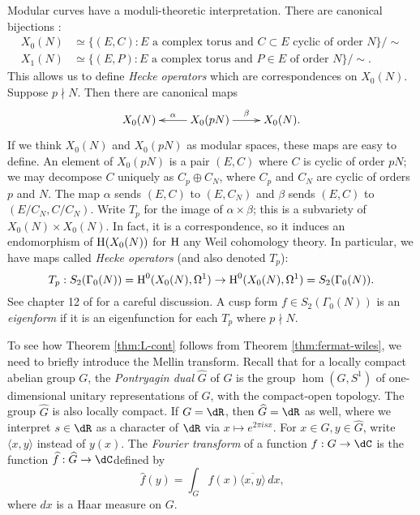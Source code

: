Modular curves have a moduli-theoretic interpretation. There are canonical 
bijections \cite[1.5]{ds05}:
\begin{align*}
  X_0(N) &\simeq \{(E,C):\text{$E$ a complex torus and $C\subset E$ cyclic of order $N$}\}/\sim  \\
  X_1(N) &\simeq \{(E,P):\text{$E$ a complex torus and $P\in E$ of order $N$}\}/\sim \text{.}
\end{align*}
This allows us to define \emph{Hecke operators} which are correspondences on 
$X_0(N)$. Suppose $p\nmid N$. Then there are canonical maps 
\[\xymatrix{
  X_0(N) 
    & \ar[l]_-\alpha X_0(p N) \ar[r]^-\beta 
    & X_0(N) \text{.}
}\]
If we think $X_0(N)$ and $X_0(p N)$ as modular spaces, these maps are easy to 
define. An element of $X_0(p N)$ is a pair $(E,C)$ where $C$ is cyclic of order 
$p N$; we may decompose $C$ uniquely as $C_p\oplus C_N$, where $C_p$ and $C_N$ 
are cyclic of orders $p$ and $N$. The map $\alpha$ sends $(E,C)$ to 
$(E,C_N)$ and $\beta$ sends $(E,C)$ to $(E/C_N,C/C_N)$. Write 
$T_p$ for the image of $\alpha\times \beta$; this is a subvariety of 
$X_0(N)\times X_0(N)$. In fact, it is a correspondence, so it induces an 
endomorphism of $\operatorname{H}(X_0(N))$ for $\operatorname{H}$ any Weil cohomology theory. In 
particular, we have maps called \emph{Hecke operators} (and also denoted 
$T_p$):
\[
  T_p:S_2(\Gamma_0(N)) = \operatorname{H}^0(X_0(N),\Omega^1) \to \operatorname{H}^0(X_0(N),\Omega^1) = S_2(\Gamma_0(N)) \text{.}
\]
See chapter 12 of \cite{rs11} for a careful discussion. A cusp form 
$f\in S_2(\Gamma_0(N))$ is an \emph{eigenform} if it is an eigenfunction for 
each $T_p$ where $p\nmid N$. 

To see how Theorem \ref{thm:L-cont} follows from Theorem 
\ref{thm:fermat-wiles}, we need to briefly introduce the Mellin transform. Recall 
that for a locally 
compact abelian group $G$, the \emph{Pontryagin dual} $\widehat G$ of $G$ is 
the group $\hom(G,S^1)$ of one-dimensional unitary representations of $G$, with 
the compact-open topology. The group $\widehat G$ is also locally compact. If 
$G=\dR$, then $\widehat G=\dR$ as well, where we interpret $s\in \dR$ as a 
character of $\dR$ via $x\mapsto e^{2\pi i s x}$. For 
$x\in G,y\in \widehat G$, write $\langle x,y\rangle$ instead of $y(x)$. The 
\emph{Fourier transform} of a function $f:G\to \dC$ is the function 
$\widehat f:\widehat G\to \dC$defined by 
\[
  \widehat f(y) = \int_G f(x) \overline{\langle x,y\rangle}\, dx \text{,}
\]
where $d x$ is a Haar measure on $G$. 

